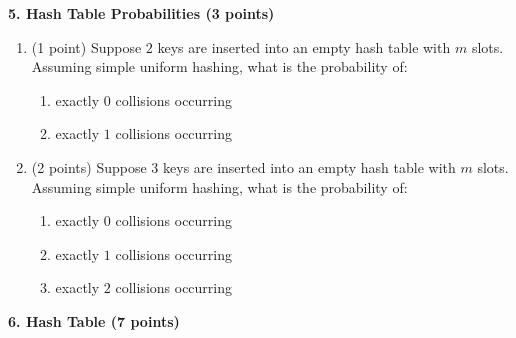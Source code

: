 \documentclass[12pt]{elsart}
\begin{document}
{\bf 5.  Hash Table Probabilities (3 points)}

\begin{enumerate}
   \item (1 point) Suppose $2$ keys are inserted into an empty hash table with $m$ slots. Assuming
simple uniform hashing, what is the probability of:
\begin{enumerate}
   \item exactly $0$ collisions occurring
   \item exactly $1$ collisions occurring\\
\end{enumerate}

   \item (2 points) Suppose $3$ keys are inserted into an empty hash table with $m$ slots. Assuming
simple uniform hashing, what is the probability of:
\begin{enumerate}
   \item exactly $0$ collisions occurring
   \item exactly $1$ collisions occurring
   \item exactly $2$ collisions occurring
\end{enumerate}

\end{enumerate}


{\bf 6.  Hash Table (7 points)}
\end{document}
